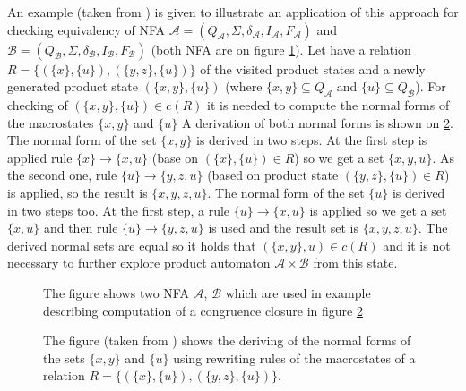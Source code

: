 An example (taken from \cite{popl13}) is given to illustrate an application of this approach for checking equivalency of 
NFA $\mathcal{A}=(Q_\mathcal{A},\Sigma,\delta_\mathcal{A},I_\mathcal{A},F_\mathcal{A})$ 
and $\mathcal{B}=(Q_\mathcal{B},\Sigma,\delta_\mathcal{B},I_\mathcal{B},F_\mathcal{B})$ (both NFA are on figure \ref{figHKCex}). 
Let have a relation $R=\{(\{x\},\{u\}),(\{y,z\},\{u\})\}$ of the visited product states and a newly generated product state 
$(\{x,y\},\{u\})$ (where $\{x,y\}\subseteq Q_\mathcal{A}$ and 
$\{u\} \subseteq Q_\mathcal{B}$). For checking of $(\{x,y\},\{u\})\in c(R)$ it is needed to compute the normal forms of the macrostates $\{x,y\}$ and $\{u\}$ 
A derivation of both normal forms is shown on \ref{figHKCRew}. 
The normal form of the set $\{x,y\}$ is derived in two steps.
At the first step is applied rule $\{x\}\rightarrow\{x,u\}$ (base on $(\{x\},\{u\})\in R$) so we get a set $\{x,y,u\}$. As the second one, rule 
$\{u\}\rightarrow\{y,z,u\}$ (based on product state $(\{y,z\},\{u\})\in R$) is applied, so the result is $\{x,y,z,u\}$. The normal form of the set $\{u\}$
is derived in two steps too. At the first step, a rule $\{u\}\rightarrow\{x,u\}$ is applied so we get a set $\{x,u\}$ and then rule 
$\{u\}\rightarrow\{y,z,u\}$  is used and the result set is $\{x,y,z,u\}$. The derived normal sets are equal so it holds that $(\{x,y\},u)\in c(R)$ and
it is not necessary to further explore product automaton $\mathcal{A}\times \mathcal{B}$ from this state.

\begin{figure}[bt]
\begin{center}
  
  
		\label{figHKCex}
    \caption{The figure shows two NFA $\mathcal{A}$, $\mathcal{B}$ 
      which are used in example describing computation of a congruence closure in figure \ref{figHKCRew}}
\end{center}
\end{figure}

\begin{figure}[bt]
  \begin{center}
    
    \label{figHKCRew}
    \caption{The figure (taken from \cite{popl13}) shows the deriving of the normal forms of the sets $\{x,y\}$ and $\{u\}$ using rewriting
      rules of the macrostates of a relation $R=\{(\{x\},\{u\}),(\{y,z\},\{u\})\}$.}
  \end{center}
\end{figure}

